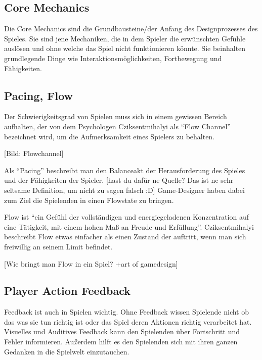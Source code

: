 \subsection{Core Mechanics}

Die Core Mechanics sind die Grundbausteine/der Anfang des Designprozesses des Spieles. Sie sind jene Mechaniken, die in dem Spieler die erwünschten Gefühle auslösen und ohne welche das Spiel nicht funktionieren könnte. Sie beinhalten grundlegende Dinge wie Interaktionsmöglichkeiten, Fortbewegung und Fähigkeiten.

\subsection{Pacing, Flow\label{_flow}}

Der Schwierigkeitsgrad von Spielen muss sich in einem gewissen Bereich aufhalten, der von dem Psychologen Cziksentmihalyi als "`Flow Channel"' bezeichnet wird, um die Aufmerksamkeit eines Spielers zu behalten\cite[S.205]{_art_of_gamedesign}.

[Bild: Flowchannel]

Als "`Pacing"' beschreibt man den Balanceakt der Herausforderung des Spieles und der Fähigkeiten der Spieler. [hast du dafür ne Quelle? Das ist ne sehr seltsame Definition, um nicht zu sagen falsch :D] Game-Designer haben dabei zum Ziel die Spielenden in einen Flowstate zu bringen.

Flow ist "`ein Gefühl der vollständigen und energiegeladenen Konzentration auf eine Tätigkeit, mit einem hohen Maß an Freude und Erfüllung"'\cite[S.204]{_art_of_gamedesign}.
Cziksentmihalyi beschreibt Flow etwas einfacher als einen Zustand der auftritt, wenn man sich freiwillig an seinem Limit befindet\cite{_flow}.

[Wie bringt man Flow in ein Spiel? +art of gamedesign]\cite{_theory_of_fun}

\subsection{Player Action Feedback}

Feedback ist auch in Spielen wichtig. Ohne Feedback wissen Spielende nicht ob das was sie tun richtig ist oder das Spiel deren Aktionen richtig verarbeitet hat. Visuelles und Auditives Feedback kann den Spielenden über Fortschritt und Fehler informieren. Außerdem hilft es den Spielenden sich mit ihren ganzen Gedanken in die Spielwelt einzutauchen.